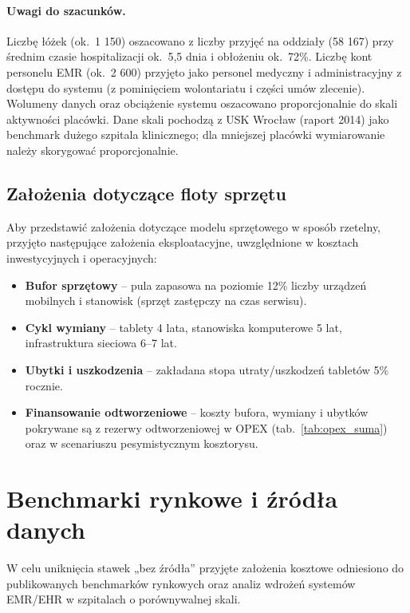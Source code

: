 \paragraph{Uwagi do szacunków.} Liczbę łóżek (ok.~1 150) oszacowano z liczby przyjęć na oddziały (58 167) przy średnim czasie hospitalizacji ok.~5,5 dnia i obłożeniu ok.~72\%. Liczbę kont personelu EMR (ok.~2 600) przyjęto jako personel medyczny i administracyjny z dostępu do systemu (z pominięciem wolontariatu i części umów zlecenie). Wolumeny danych oraz obciążenie systemu oszacowano proporcjonalnie do skali aktywności placówki. Dane skali pochodzą z USK Wrocław (raport 2014) jako benchmark dużego szpitala klinicznego; dla mniejszej placówki wymiarowanie należy skorygować proporcjonalnie.

\subsection{Założenia dotyczące floty sprzętu}

Aby przedstawić założenia dotyczące modelu sprzętowego w sposób rzetelny, przyjęto następujące założenia eksploatacyjne, uwzględnione w kosztach inwestycyjnych i operacyjnych:

\begin{itemize}
    \item \textbf{Bufor sprzętowy} – pula zapasowa na poziomie 12\% liczby urządzeń mobilnych i stanowisk (sprzęt zastępczy na czas serwisu).
    \item \textbf{Cykl wymiany} – tablety 4 lata, stanowiska komputerowe 5 lat, infrastruktura sieciowa 6--7 lat.
    \item \textbf{Ubytki i uszkodzenia} – zakładana stopa utraty/uszkodzeń tabletów 5\% rocznie.
    \item \textbf{Finansowanie odtworzeniowe} – koszty bufora, wymiany i ubytków pokrywane są z rezerwy odtworzeniowej w OPEX (tab.~\ref{tab:opex_suma}) oraz w scenariuszu pesymistycznym kosztorysu.
\end{itemize}

\section{Benchmarki rynkowe i źródła danych}

W celu uniknięcia stawek „bez źródła” przyjęte założenia kosztowe odniesiono do publikowanych benchmarków rynkowych oraz analiz wdrożeń systemów EMR/EHR w szpitalach o porównywalnej skali.

